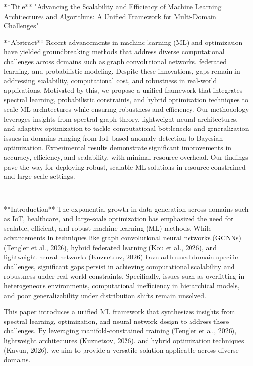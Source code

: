 **Title**  
"Advancing the Scalability and Efficiency of Machine Learning Architectures and Algorithms: A Unified Framework for Multi-Domain Challenges"

**Abstract**  
Recent advancements in machine learning (ML) and optimization have yielded groundbreaking methods that address diverse computational challenges across domains such as graph convolutional networks, federated learning, and probabilistic modeling. Despite these innovations, gaps remain in addressing scalability, computational cost, and robustness in real-world applications. Motivated by this, we propose a unified framework that integrates spectral learning, probabilistic constraints, and hybrid optimization techniques to scale ML architectures while ensuring robustness and efficiency. Our methodology leverages insights from spectral graph theory, lightweight neural architectures, and adaptive optimization to tackle computational bottlenecks and generalization issues in domains ranging from IoT-based anomaly detection to Bayesian optimization. Experimental results demonstrate significant improvements in accuracy, efficiency, and scalability, with minimal resource overhead. Our findings pave the way for deploying robust, scalable ML solutions in resource-constrained and large-scale settings.

---

**Introduction**  
The exponential growth in data generation across domains such as IoT, healthcare, and large-scale optimization has emphasized the need for scalable, efficient, and robust machine learning (ML) methods. While advancements in techniques like graph convolutional neural networks (GCNNs) (Tengler et al., 2026), hybrid federated learning (Kou et al., 2026), and lightweight neural networks (Kuznetsov, 2026) have addressed domain-specific challenges, significant gaps persist in achieving computational scalability and robustness under real-world constraints. Specifically, issues such as overfitting in heterogeneous environments, computational inefficiency in hierarchical models, and poor generalizability under distribution shifts remain unsolved.

This paper introduces a unified ML framework that synthesizes insights from spectral learning, optimization, and neural network design to address these challenges. By leveraging manifold-constrained training (Tengler et al., 2026), lightweight architectures (Kuznetsov, 2026), and hybrid optimization techniques (Kavun, 2026), we aim to provide a versatile solution applicable across diverse domains.


